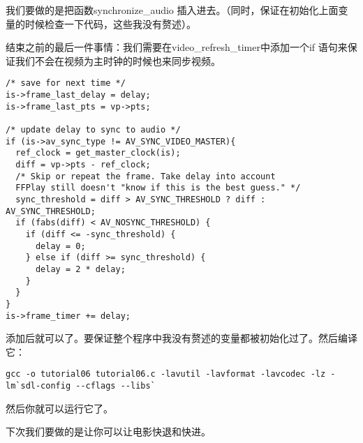 我们要做的是把函数synchronize_audio 插入进去。（同时，保证在初始化上面变量的时候检查一下代码，这些我没有赘述）。

结束之前的最后一件事情：我们需要在video_refresh_timer中添加一个if 语句来保证我们不会在视频为主时钟的时候也来同步视频。
\begin{lstlisting}
/* save for next time */
is->frame_last_delay = delay;
is->frame_last_pts = vp->pts;

/* update delay to sync to audio */
if (is->av_sync_type != AV_SYNC_VIDEO_MASTER){
  ref_clock = get_master_clock(is);
  diff = vp->pts - ref_clock;
  /* Skip or repeat the frame. Take delay into account
  FFPlay still doesn't "know if this is the best guess." */
  sync_threshold = diff > AV_SYNC_THRESHOLD ? diff : AV_SYNC_THRESHOLD;
  if (fabs(diff) < AV_NOSYNC_THRESHOLD) {
    if (diff <= -sync_threshold) {
      delay = 0;
    } else if (diff >= sync_threshold) {
      delay = 2 * delay;
    }
  }
}
is->frame_timer += delay;
\end{lstlisting}

添加后就可以了。要保证整个程序中我没有赘述的变量都被初始化过了。然后编译它：
\begin{lstlisting}
gcc -o tutorial06 tutorial06.c -lavutil -lavformat -lavcodec -lz -lm`sdl-config --cflags --libs`
\end{lstlisting}
然后你就可以运行它了。

下次我们要做的是让你可以让电影快退和快进。
